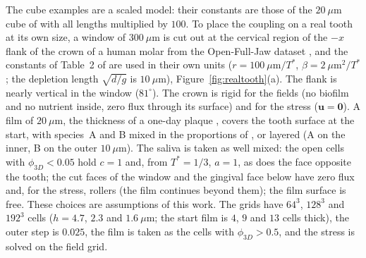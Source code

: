 \documentclass[11pt,a4paper]{article}
\newcommand{\phiD}{\phi_{3D}}
\begin{document}
The cube examples are a scaled model: their constants are those of the $20~\mu$m cube of \citet{Klempt2024DiffusionDrivenGrowth} with all lengths multiplied by $100$. To place the coupling on a real tooth at its own size, a window of $300~\mu$m is cut out at the cervical region of the $-x$ flank of the crown of a human molar from the Open-Full-Jaw dataset \citep{Gholamalizadeh2022OpenFullJaw}, and the constants of Table~2 of \citet{Klempt2024DiffusionDrivenGrowth} are used in their own units ($r=100~\mu$m$/T^*$, $\beta=2~\mu$m$^2/T^*$; the depletion length $\sqrt{d/g}$ is $10~\mu$m), Figure~\ref{fig:realtooth}(a). The flank is nearly vertical in the window ($81^\circ$). The crown is rigid for the fields (no biofilm and no nutrient inside, zero flux through its surface) and for the stress ($\mathbf u=\mathbf 0$). A film of $20~\mu$m, the thickness of a one-day plaque \citep{AlAhmad2007PlaqueFISH}, covers the tooth surface at the start, with species~A and B mixed in the proportions of \citet{Fritsch2025BayesianMicrofilms}, or layered (A on the inner, B on the outer $10~\mu$m). The saliva is taken as well mixed: the open cells with $\phiD<0.05$ hold $c=1$ and, from $T^*=1/3$, $a=1$, as does the face opposite the tooth; the cut faces of the window and the gingival face below have zero flux and, for the stress, rollers (the film continues beyond them); the film surface is free. These choices are assumptions of this work. The grids have $64^3$, $128^3$ and $192^3$ cells ($h=4.7$, $2.3$ and $1.6~\mu$m; the start film is $4$, $9$ and $13$ cells thick), the outer step is $0.025$, the film is taken as the cells with $\phiD>0.5$, and the stress is solved on the field grid.
\end{document}
